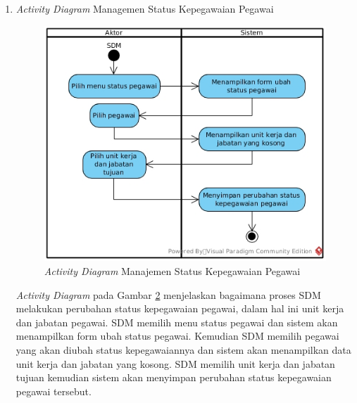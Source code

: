 \begin{enumerate}
\begin{figure}[H]
            		    \caption{\emph{Activity Diagram} Manajemen Data Jabatan}
            		    \label{activity_manajemen_jabatan}
            		\end{figure}
            		\emph{Activity Diagram} pada Gambar \ref{activity_manajemen_jabatan} menjelaskan bagaimana SDM melakukan manajemen data jabatan. Pada setiap proses menambah data, mengubah data dan menghapus data jabatan, sistem akan melakukan validasi data terlebih dahulu sebelum memproses tindakan tersebut. Seperti ketika ingin menghapus data jabatan, apabila jabatan tersebut terisi oleh karyawan, maka sistem akan membatalkan proses penghapusan tersebut. \newpage
            	\item \emph{Activity Diagram} Managemen Status Kepegawaian Pegawai
            	    \begin{figure}[H]
            		    \centering
            		    \includegraphics[width=14cm]{gambar/activity/manajemen-status-pegawai}
            		    \caption{\emph{Activity Diagram} Manajemen Status Kepegawaian Pegawai}
            		    \label{activity_status_pegawai}
            		\end{figure}
            		\emph{Activity Diagram} pada Gambar \ref{activity_status_pegawai} menjelaskan bagaimana proses SDM melakukan perubahan status kepegawaian pegawai, dalam hal ini unit kerja dan jabatan pegawai. SDM memilih menu status pegawai dan sistem akan menampilkan form ubah status pegawai. Kemudian SDM memilih pegawai yang akan diubah status kepegawaiannya dan sistem akan menampilkan data unit kerja dan jabatan yang kosong. SDM memilih unit kerja dan jabatan tujuan kemudian sistem akan menyimpan perubahan status kepegawaian pegawai tersebut. \newpage

\end{enumerate}
